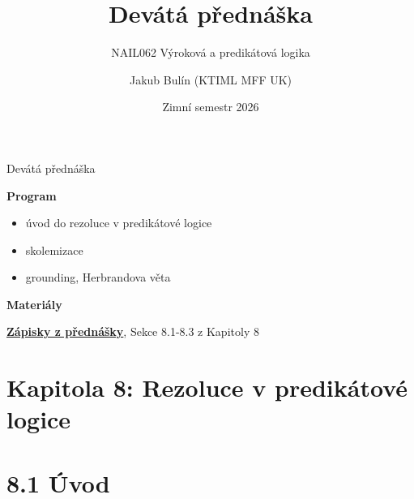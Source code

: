 \documentclass{beamer}
\title{Devátá přednáška}
\subtitle{NAIL062 Výroková a predikátová logika}
\author{Jakub Bulín (KTIML MFF UK)}
\date{Zimní semestr 2026}
\begin{document}
\maketitle


\begin{frame}{Devátá přednáška}

    \textbf{Program}
        \begin{itemize}
            \item úvod do rezoluce v predikátové logice
            \item skolemizace
            \item grounding, Herbrandova věta
        \end{itemize}

    \textbf{Materiály}

        \href{https://github.com/jbulin-mff-uk/nail062/raw/main/lecture/lecture-notes/lecture-notes.pdf}{\alert{\textbf{Zápisky z přednášky}}}, Sekce 8.1-8.3 z Kapitoly 8

\end{frame}


\section{\sc Kapitola 8: Rezoluce v predikátové logice}


\section{8.1 Úvod}
\end{document}
